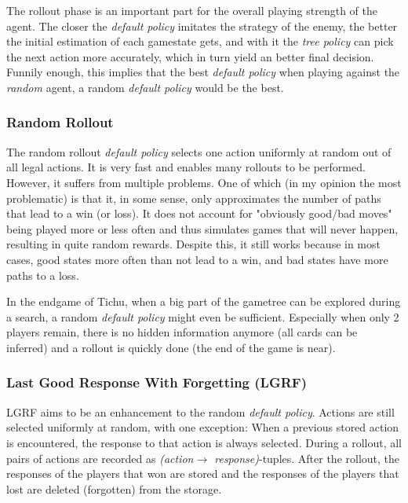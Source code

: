 The rollout phase is an important part for the overall playing strength of the agent. The closer the \textit{default policy} imitates the strategy of the enemy, the better the initial estimation of each gamestate gets, and with it the \textit{tree policy} can pick the next action more accurately, which in turn yield an better final decision. \newline
Funnily enough, this implies that the best \textit{default policy} when playing against the \textit{random} agent, a random \textit{default policy} would be the best.


\subsubsection{Random Rollout}
The random rollout \textit{default policy} selects one action uniformly at random out of all legal actions.
It is very fast and enables many rollouts to be performed. However, it suffers from multiple problems. One of which (in my opinion the most problematic) is that it, in some sense, only approximates the number of paths that lead to a win (or loss). It does not account for "obviously good/bad moves" being played more or less often and thus simulates games that will never happen, resulting in quite random rewards.\newline
Despite this, it still works because in most cases, good states more often than not lead to a win, and bad states have more paths to a loss.

In the endgame of Tichu, when a big part of the gametree can be explored during a search, a random \textit{default policy} might even be sufficient. Especially when only 2 players remain, there is no hidden information anymore (all cards can be inferred) and a rollout is quickly done (the end of the game is near).

\subsubsection{Last Good Response With Forgetting (LGRF)}
\label{sec:lgrf}
LGRF aims to be an enhancement to the random \textit{default policy}. Actions are still selected uniformly at random, with one exception: When a previous stored action is encountered, the response to that action is always selected.
During a rollout, all pairs of actions are recorded as  \textit{(action$\rightarrow$ response)}-tuples. After the rollout, the responses of the players that won are stored and the responses of the players that lost are deleted (forgotten) from the storage.\cite{whitehouse14}\newline

